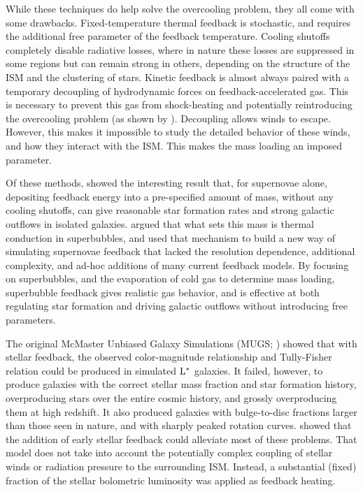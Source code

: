 While these techniques do help solve the overcooling problem, they all come with
some drawbacks.  Fixed-temperature thermal feedback is stochastic, and requires
the additional free parameter of the feedback temperature. Cooling shutoffs
completely disable radiative losses, where in nature these losses are suppressed
in some regions but can remain strong in others, depending on the structure of
the ISM and the clustering of stars.  Kinetic feedback is almost always paired
with a temporary decoupling of hydrodynamic forces on feedback-accelerated gas.
This is necessary to prevent this gas from shock-heating and potentially
reintroducing the overcooling problem (as shown by
\citealt{Creasey2011,Durier2012}).  Decoupling allows winds to escape.  However,
this makes it impossible to study the detailed behavior of these winds, and how
they interact with the ISM.  This makes the mass loading an imposed parameter.

Of these methods, \citet{DallaVecchia2012} showed the interesting result that,
for supernovae alone, depositing feedback energy into a pre-specified amount of
mass, without any cooling shutoffs, can give reasonable star formation rates and
strong galactic outflows in isolated galaxies.  \citet{Keller2014} argued that
what sets this mass is thermal conduction in superbubbles, and used that
mechanism to build a new way of simulating supernovae feedback that lacked the
resolution dependence, additional complexity, and ad-hoc additions of many
current feedback models.  By focusing on superbubbles, and the evaporation of
cold gas to determine mass loading, superbubble feedback gives realistic gas
behavior, and is effective at both regulating star formation and driving
galactic outflows without introducing free parameters.

The original McMaster Unbiased Galaxy Simulations (MUGS; \citealt{Stinson2010})
showed that with stellar feedback, the observed color-magnitude relationship and
Tully-Fisher relation could be produced in simulated $\rm{L^*}$ galaxies.  It
failed, however, to produce galaxies with the correct stellar mass fraction and
star formation history, overproducing stars over the entire cosmic history, and
grossly overproducing them at high redshift.  It also produced galaxies with
bulge-to-disc fractions larger than those seen in nature, and with sharply
peaked rotation curves.  \citet{Stinson2013} showed that the addition of early
stellar feedback could alleviate most of these problems.  That model does not
take into account the potentially complex coupling of stellar winds or radiation
pressure to the surrounding ISM.  Instead, a substantial (fixed) fraction of the
stellar bolometric luminosity was applied as feedback heating.


